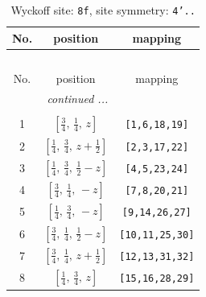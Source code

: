 \documentclass[fleqn,8pt]{jsarticle}
\begin{document}
\begin{longtable}{ccc}
\caption{Wyckoff site: {\tt 8f}, site symmetry: {\tt 4'..}}
 \\
 \hline \hline
No. & position & mapping \\ \hline \endfirsthead

\multicolumn{2}{l}{\tablename\ \thetable{}} \\
 \hline \hline
No. & position & mapping \\ \hline \endhead

 \hline \hline
\multicolumn{2}{r}{\footnotesize\it continued ...} \\ \endfoot

 \hline \hline
\multicolumn{2}{r}{} \\ \endlastfoot

1 & $\left[ \frac{3}{4},\, \frac{1}{4},\, z \right]$ & {\tt [1,6,18,19]} \\ \hline
2 & $\left[ \frac{1}{4},\, \frac{3}{4},\, z + \frac{1}{2} \right]$ & {\tt [2,3,17,22]} \\ \hline
3 & $\left[ \frac{1}{4},\, \frac{3}{4},\, \frac{1}{2} - z \right]$ & {\tt [4,5,23,24]} \\ \hline
4 & $\left[ \frac{3}{4},\, \frac{1}{4},\, - z \right]$ & {\tt [7,8,20,21]} \\ \hline
5 & $\left[ \frac{1}{4},\, \frac{3}{4},\, - z \right]$ & {\tt [9,14,26,27]} \\ \hline
6 & $\left[ \frac{3}{4},\, \frac{1}{4},\, \frac{1}{2} - z \right]$ & {\tt [10,11,25,30]} \\ \hline
7 & $\left[ \frac{3}{4},\, \frac{1}{4},\, z + \frac{1}{2} \right]$ & {\tt [12,13,31,32]} \\ \hline
8 & $\left[ \frac{1}{4},\, \frac{3}{4},\, z \right]$ & {\tt [15,16,28,29]} \\
\end{longtable}
\renewcommand{\arraystretch}{1.2}
\end{document}

